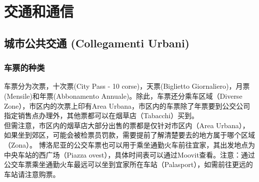 
% 


\chapter{交通和通信}                 %

\section{城市公共交通 (Collegamenti Urbani)}

\subsection{车票的种类}
车票分为次票，十次票(City Pass - 10 corse)，天票(Biglietto Giornaliero)，月票(Mensile)和年票(Abbonamento Annuale)。除此，车票还分乘车区域（Diverse Zone），市区内的次票上印有Area Urbana，市区内的车票除了年票要到公交公司指定销售点办理外，其他票都可以在烟草店（Tabacchi）买到。\\
但需注意，市区内的烟草店大部分出售的票都是仅针对市区内（Area Urbana），如果坐到郊区，可能会被检票员罚款，需要提前了解清楚要去的地方属于哪个区域（Zona）。
博洛尼亚的公交车票也可以用于乘坐通勤火车前往宜家，其出发地点为中央车站的西广场（Piazza ovest），具体时间表可以通过Moovit查看。注意：通过公交车票乘坐通勤火车最远可以坐到宜家所在车站（Palasport），如需前往更远的车站请注意购票。

